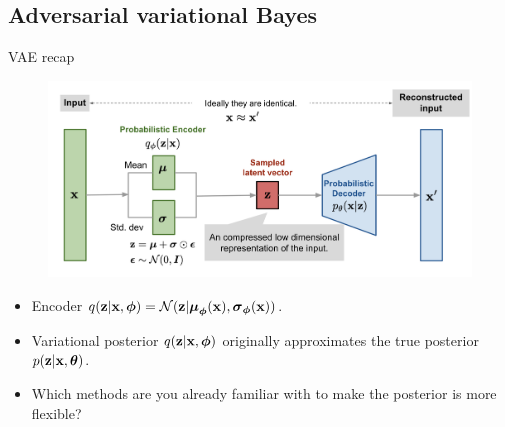 \subsection{Adversarial variational Bayes}
\begin{frame}{VAE recap}
	\vspace{-0.3cm}
	\begin{figure}[h]
		\centering
		\includegraphics[width=\linewidth]{figs/vae-gaussian.png}
	\end{figure}
	\vspace{-0.5cm}
	\begin{itemize}
		\item Encoder $q(\mathbf{z} | \mathbf{x}, \boldsymbol{\phi}) = \mathcal{N}(\mathbf{z} | \boldsymbol{\mu}_{\boldsymbol{\phi}}(\mathbf{x}), \boldsymbol{\sigma}_{\boldsymbol{\phi}}(\mathbf{x}))$.
		\item Variational posterior $q(\mathbf{z} | \mathbf{x}, \boldsymbol{\phi})$ originally approximates the true posterior $p(\mathbf{z} | \mathbf{x}, \boldsymbol{\theta})$.
		\item Which methods are you already familiar with to make the posterior is more flexible?
	\end{itemize}
\end{frame}
